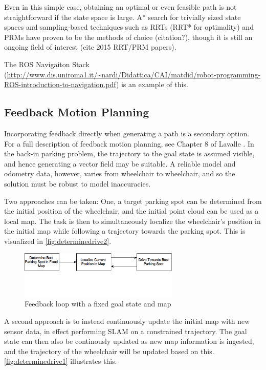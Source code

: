 Even in this simple case, obtaining an optimal or even feasible path is not
straightforward if the state space is large. A* search for trivially sized state
spaces and sampling-based techniques such as RRTs (RRT* for optimality) and PRMs
have proven to be the methods of choice (citation?), though it is still an
ongoing field of interest (cite 2015 RRT/PRM papers).

The ROS Navigaiton Stack
(\url{http://www.dis.uniroma1.it/~nardi/Didattica/CAI/matdid/robot-programming-ROS-introduction-to-navigation.pdf})
is an example of this.
\subsection{Feedback Motion Planning}
Incorporating feedback directly when generating a path is a secondary option. 
For a full description of feedback motion planning, see Chapter 8 of Lavalle
\cite{lavalle2006planning}.
In the back-in parking problem, the trajectory to the goal state is assumed
visible, and hence generating a vector field may be suitable. A reliable model
and odometry data, however, varies from wheelchair to wheelchair, and so the
solution must be robust to model inaccuracies.

Two approaches can be taken: One, a target parking spot can be determined from
the initial position of the wheelchair, and the initial point cloud can be used
as a local map. The task is then to simultaneously localize the wheelchair's
position in the initial map while following a trajectory towards the parking
spot. This is visualized in \autoref{fig:determinedrive2}.
 
\begin{figure} %
\centering
\includegraphics[width=3in]{figures/determinedrive2.png}
\caption{Feedback loop with a fixed goal state and map}
\label{fig:determinedrive2}
\end{figure}   %

A second approach is to instead continuously update the initial map with new
sensor data, in effect performing SLAM on a constrained trajectory. The goal
state can then also be continously updated as new map information is ingested,
and the trajectory of the wheelchair will be updated based on this.
\autoref{fig:determinedrive1} illustrates this.
 
